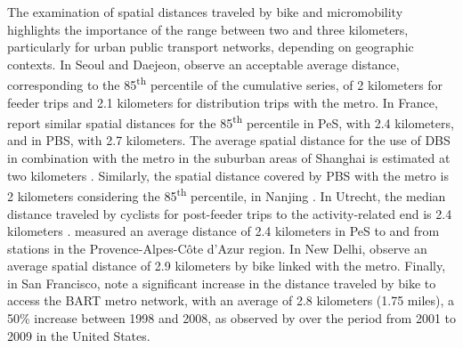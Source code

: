 \begin{refsegment}
The examination of spatial distances traveled by bike and micromobility highlights the importance of the range between two and three kilometers, particularly for urban public transport networks, depending on geographic contexts. In Seoul and Daejeon, \textcolor{blue}{\textcite[982]{lee_bicycle-based_2016}} observe an acceptable average distance, corresponding to the 85\textsuperscript{th} percentile of the cumulative series, of 2 kilometers for feeder trips and 2.1 kilometers for distribution trips with the metro. In France, \textcolor{blue}{\textcite[62]{rabaud_quand_2022}} report similar spatial distances for the 85\textsuperscript{th} percentile in \acrshort{PeS}, with 2.4 kilometers, and in \acrshort{PBS}, with 2.7 kilometers. The average spatial distance for the use of \acrshort{DBS} in combination with the metro in the suburban areas of Shanghai is estimated at two kilometers \textcolor{blue}{\autocite[24]{lin_analysis_2019}}. Similarly, the spatial distance covered by \acrshort{PBS} with the metro is 2 kilometers considering the 85\textsuperscript{th} percentile, in Nanjing \textcolor{blue}{\autocite[64]{ma_understanding_2018}}. In Utrecht, the median distance traveled by cyclists for post-feeder trips to the activity-related end is 2.4 kilometers \textcolor{blue}{\autocite[268]{krygsman_multimodal_2004}}. \textcolor{blue}{\textcite[22]{moinse_intermodal_2022}} measured an average distance of 2.4 kilometers in \acrshort{PeS} to and from stations in the Provence-Alpes-Côte d'Azur region. In New Delhi, \textcolor{blue}{\textcite[16]{ann_examination_2019}} observe an average spatial distance of 2.9 kilometers by bike linked with the metro. Finally, in San Francisco, \textcolor{blue}{\textcite[95]{cervero_bike-and-ride_2013}} note a significant increase in the distance traveled by bike to access the BART metro network, with an average of 2.8 kilometers (1.75 miles), a 50\% increase between 1998 and 2008, as observed by \textcolor{blue}{\textcite[101]{wang_bicycle-transit_2013}} over the period from 2001 to 2009 in the United States.%


\end{refsegment}
